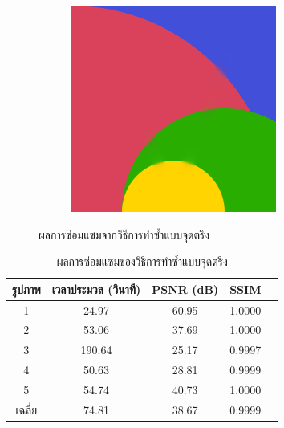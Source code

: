 \documentclass[hidelinks, a4paper,12pt]{article}
\numberwithin{equation}{section}							%
\numberwithin{equation}{section}
\begin{document}
{\begin{figure}[H]
\begin{subfigure}{0.4\linewidth}
		\includegraphics[width=0.8\linewidth]{images/result_ex1/fixpoint05.png}			
	\end{subfigure}
	\caption{ผลการซ่อมแซมจากวิธีการทำซ้ำแบบจุดตรึง}
\end{figure}
\begin{table}[H]
	\centering
	\begin{tabular}[ht]{|c|c|c|c|c|}
		\hline
		รูปภาพ &เวลาประมวล  (วินาที) & PSNR (dB) & SSIM \\
		\hline
		1 & 24.97 & 60.95 & 1.0000 \\ 
		2 & 53.06 & 37.69 & 1.0000 \\
		3 &  190.64 & 25.17 & 0.9997 \\
		4 & 50.63  & 28.81  & 0.9999 \\
		5 & 54.74  & 40.73  & 1.0000 \\
		\hline
		เฉลี่ย & 74.81  & 38.67  & 0.9999 \\
		\hline
	\end{tabular}
	\caption{ผลการซ่อมแซมของวิธีการทำซ้ำแบบจุดตรึง}
\end{table}	
\begin{figure}[H]
	\centering
	\begin{subfigure}{0.4\linewidth}
		\centering

\end{subfigure}
\end{figure}}
\end{document}
